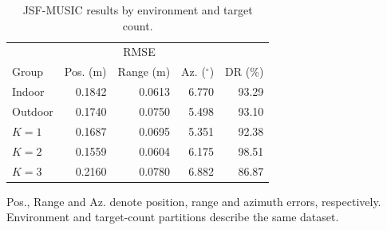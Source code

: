 \begin{table}[t]
\centering
\caption{JSF-MUSIC results by environment and target count.}
\label{tab:groups}
\footnotesize
\setlength{\tabcolsep}{3pt}
\begin{tabular}{lrrrr}
\hline
 & \multicolumn{3}{c}{RMSE} & \\ Group & Pos. (m) & Range (m) & Az. ($^\circ$) & DR (\%) \\
\hline
Indoor & 0.1842 & 0.0613 & 6.770 & 93.29 \\
Outdoor & 0.1740 & 0.0750 & 5.498 & 93.10 \\
$K=1$ & 0.1687 & 0.0695 & 5.351 & 92.38 \\
$K=2$ & 0.1559 & 0.0604 & 6.175 & 98.51 \\
$K=3$ & 0.2160 & 0.0780 & 6.882 & 86.87 \\
\hline
\end{tabular}
\par\smallskip\parbox{0.98\linewidth}{\scriptsize Pos., Range and Az. denote position, range and azimuth errors, respectively. Environment and target-count partitions describe the same dataset.}
\end{table}
